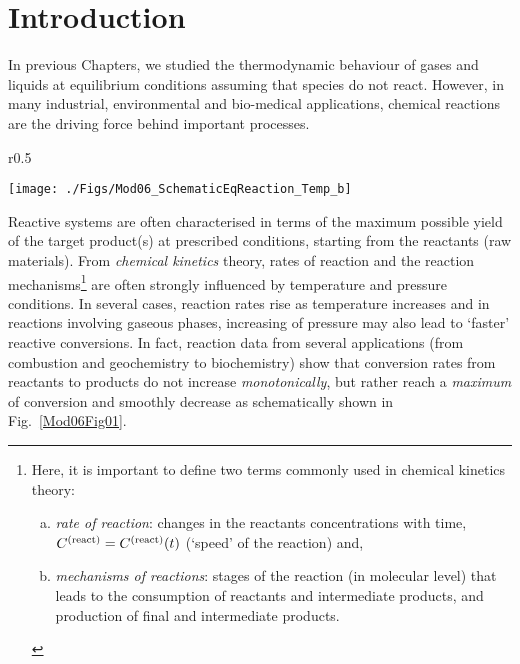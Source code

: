 \localtableofcontents
   
\section{Introduction}\label{Chapter:ChemicalReactions:Section:Introduction}
In previous Chapters, we studied the thermodynamic behaviour of gases and liquids at equilibrium conditions assuming that species do not react. However, in many industrial, environmental and bio-medical applications, chemical reactions are the driving force behind important processes.
      \begin{wrapfigure}{r}{0.5\textwidth}%
         \begin{center}
           \texttt{[image: ./Figs/Mod06\_SchematicEqReaction\_Temp\_b]}
           \caption{Sketch of equilibrium reaction and temperature.}\label{Mod06Fig01}
         \end{center}
       \end{wrapfigure}%
      Reactive systems are often characterised in terms of the maximum possible yield of the target product(s) at prescribed conditions, starting from the reactants (\ie raw materials). From {\it chemical kinetics} theory, rates of reaction and the reaction mechanisms\footnote{Here, it is important to define two terms commonly used in chemical kinetics theory:
        \begin{enumerate}[a)]
           \item {\it rate of reaction}: changes in the reactants concentrations with time, $\mfr[C]{}{\text{react}}=\mfr[C]{}{\text{react}}(t)$ (\ie `speed' of the reaction) and,
           \item {\it mechanisms of reactions}: stages of the reaction (in molecular level) that leads to the consumption of reactants and intermediate products, and production of final and intermediate products.
        \end{enumerate}
         }
        are often strongly influenced by temperature and pressure conditions. In several cases, reaction rates rise as temperature increases and in reactions involving gaseous phases, increasing of pressure may also lead to `faster' reactive conversions. In fact, reaction data from several applications (from combustion and geochemistry to biochemistry) show that conversion rates from reactants to products do not increase {\it monotonically}, but rather reach a {\it maximum} of conversion and smoothly decrease as schematically shown in Fig.~\ref{Mod06Fig01}.

